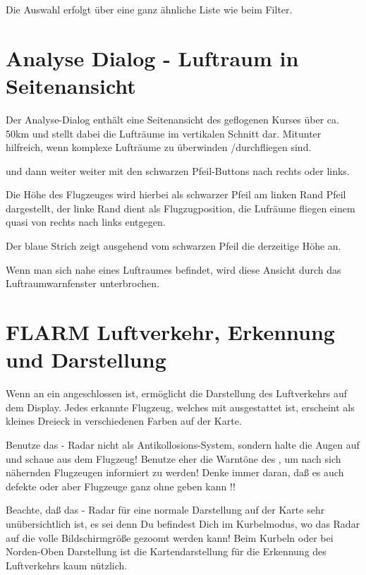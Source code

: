  Die Auswahl erfolgt über eine ganz ähnliche Liste wie beim Filter. 


\section{Analyse  Dialog - Luftraum in Seitenansicht}
Der Analyse-Dialog enthält eine Seitenansicht des geflogenen Kurses über ca. 50km und stellt
dabei die Lufträume im vertikalen Schnitt dar.
Mitunter hilfreich, wenn komplexe Lufträume zu überwinden /durchfliegen sind.

und dann weiter weiter mit den schwarzen Pfeil-Buttons  nach rechts oder links.

Die Höhe des Flugzeuges wird hierbei als schwarzer Pfeil am linken Rand Pfeil dargestellt, der linke
Rand dient als Flugzugposition, die Lufräume fliegen einem quasi von rechts nach links entgegen.

Der blaue Strich zeigt ausgehend vom schwarzen Pfeil die derzeitige Höhe an.


Wenn man sich nahe eines Luftraumes befindet, wird diese Ansicht durch das
Luftraumwarnfenster unterbrochen.


\section{FLARM Luftverkehr, Erkennung und Darstellung}
Wenn \xc an ein \fl angeschlossen ist, ermöglicht \xc die Darstellung
des Luftverkehrs auf dem Display. Jedes erkannte Flugzeug, welches mit \fl
ausgestattet ist,  erscheint als kleines Dreieck in verschiedenen Farben  auf der Karte.

\achtung Benutze das \xc \fl- Radar nicht als Antikollosions-System, sondern halte die Augen auf und schaue
aus dem Flugzeug! Benutze eher die Warntöne des \fl , um nach sich nähernden Flugzeugen informiert zu werden!
Denke immer daran, daß es auch defekte \fl oder aber Flugzeuge ganz ohne \fl geben kann !!

Beachte, daß das \fl- Radar für eine normale Darstellung auf der Karte sehr unübersichtlich ist, es sei denn
Du befindest Dich im Kurbelmodus, wo das Radar auf die volle Bildschirmgröße gezoomt werden kann!
Beim Kurbeln oder bei Norden-Oben Darstellung ist die Kartendarstellung für die Erkennung des Luftverkehrs
kaum nützlich.

